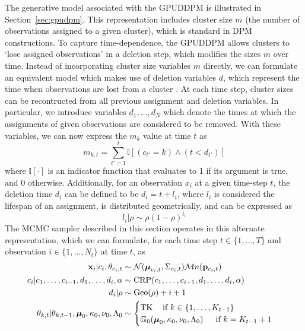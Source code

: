 \documentclass[smallcondensed, final]{svjour3}
\begin{document}
The generative model associated with the GPUDDPM is illustrated in Section~\ref{sec:gpudpm}. This representation includes cluster size $m$ (the number of observations assigned to a given cluster), which is standard in DPM constructions. To capture time-dependence, the GPUDDPM allows clusters to `lose assigned observations' in a deletion step, which modifies the sizes $m$ over time. Instead of incorporating cluster size variables $m$ directly, we can formulate an equivalent model which makes use of deletion variables $d$, which represent the time when observations are lost from a cluster . At each time step, cluster sizes can be recontructed from all previous assignment and deletion variables. In particular, we introduce variables $d_{1}, \ldots, d_{N}$ which denote the times at which the assignments of given observations are considered to be removed. With these variables, we can now express the $m_{k}$ value at time $t$ as
\begin{equation}
\label{compute_clust_size}
m_{k,t} = \sum_{t' = 1}^{t} \mathbb{I}[(c_{t'}=k) \wedge (t < d_{t'})]
\end{equation}
where $\mathbb{I}[\cdot]$ is an indicator function that evaluates to 1 if its argument is true, and 0 otherwise. Additionally, for an observation $x_{i}$ at a given time-step $t$, the deletion time $d_{i}$ can be defined to be $d_{i} = t + l_{i}$, where $l_{i}$ is considered the lifespan of an assignment, is distributed geometrically, and can be expressed as
\begin{equation}
\label{del_rho_form}
l_{i} | \rho  \sim  \rho(1 - \rho)^{l_{i}}
\end{equation}
The MCMC sampler described in this section operates in this alternate representation, which we can formulate, for each time step $t \in \{1, \ldots, T\}$ and observation $i \in \{ 1, \ldots, N_{t} \}$ at time $t$, as
\begin{align}
\begin{split}
	 \bold{x}_{i} | c_{i}, \theta_{c_{i},t} &\sim \mathcal{N}(\boldsymbol{\mu}_{c_{i},t}, \Sigma_{c_{i},t})  \mathcal{M}n(\bold{p}_{c_{i},t}) \\
	c_{i} | c_{1}, \ldots, c_{i-1}, d_{1}, \ldots, d_{i}, \alpha  &\sim  \text{CRP}(c_{1}, \ldots, c_{i-1}, d_{1}, \ldots, d_{i}, \alpha) \\
	d_{i} | \rho  &\sim \text{Geo}(\rho) + i + 1\\
	\theta_{k, t} | \theta_{k, t-1}, \boldsymbol{\mu}_{0}, \kappa_{0}, \nu_{0}, \Lambda_{0}  &\sim 
\begin{cases}
	\text{TK} \hspace{12pt} \text{if } k \in \{ 1, \ldots, K_{t-1}  \} \\
	\mathbb{G}_{0}(\boldsymbol{\mu}_{0}, \kappa_{0}, \nu_{0}, \Lambda_{0})  \hspace{15pt} \text{if } k = K_{t-1} + 1
\end{cases}
\end{split}
\end{align}
\end{document}
